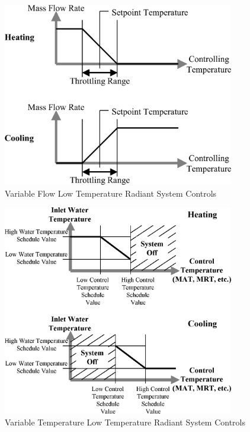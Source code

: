 \begin{figure}[hbtp] %
\centering
\includegraphics[width=0.9\textwidth, height=0.9\textheight, keepaspectratio=true]{media/image6053.png}
\caption{Variable Flow Low Temperature Radiant System Controls \protect \label{fig:variable-flow-low-temperature-radiant-system}}
\end{figure}

\begin{figure}[hbtp] %
\centering
\includegraphics[width=0.9\textwidth, height=0.9\textheight, keepaspectratio=true]{media/image6054.png}
\caption{Variable Temperature Low Temperature Radiant System Controls \protect \label{fig:variable-temperature-low-temperature-radiant}}
\end{figure}

